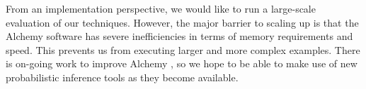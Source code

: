 % 
% 
% 
% 



From an implementation perspective, we would like to run a large-scale
evaluation of our techniques.
However, the major barrier to scaling up is that the Alchemy software has severe
inefficiencies in terms of memory requirements and speed.  This prevents us
from executing larger and more complex examples.  There is on-going work to improve
Alchemy \citep{gogate:uai2011}, so we hope to be able to make use of new
probabilistic inference tools as they become available.



